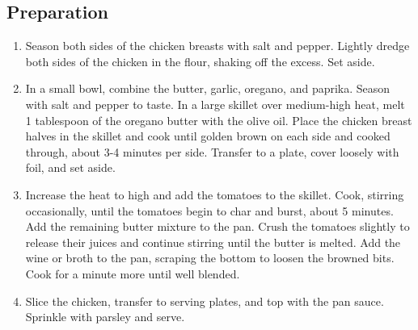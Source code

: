 \subsection{Preparation}
\begin{enumerate}
    \item Season both sides of the chicken breasts with salt and pepper.  Lightly dredge both sides of the chicken in the flour, shaking off the excess.  Set aside.
    \item In a small bowl, combine the butter, garlic, oregano, and paprika.  Season with salt and pepper to taste.  In a large skillet over medium-high heat, melt 1 tablespoon of the oregano butter with the olive oil.  Place the chicken breast halves in the skillet and cook until golden brown on each side and cooked through, about 3-4 minutes per side.  Transfer to a plate, cover loosely with foil, and set aside.
    \item Increase the heat to high and add the tomatoes to the skillet.  Cook, stirring occasionally, until the tomatoes begin to char and burst, about 5 minutes.  Add the remaining butter mixture to the pan.  Crush the tomatoes slightly to release their juices and continue stirring until the butter is melted.  Add the wine or broth to the pan, scraping the bottom to loosen the browned bits.  Cook for a minute more until well blended.
    \item Slice the chicken, transfer to serving plates, and top with the pan sauce.  Sprinkle with parsley and serve.
\end{enumerate}

